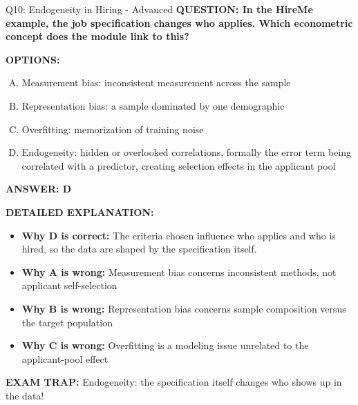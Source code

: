 \documentclass[8pt]{beamer}
\begin{document}
\begin{frame}[shrink=6]{Q10: Endogeneity in Hiring - Advanced}
\fontsize{6.5}{7.5}\selectfont
\textbf{QUESTION: In the HireMe example, the job specification changes who applies. Which econometric concept does the module link to this?}

\vspace{0.1cm}
\textbf{OPTIONS:}
\begin{enumerate}[A.]
\item Measurement bias: inconsistent measurement across the sample
\item Representation bias: a sample dominated by one demographic
\item Overfitting: memorization of training noise
\item Endogeneity: hidden or overlooked correlations, formally the error term being correlated with a predictor, creating selection effects in the applicant pool
\end{enumerate}

\vspace{0.1cm}
\textcolor{myblue}{\textbf{ANSWER: D}}

\vspace{0.1cm}
\textbf{DETAILED EXPLANATION:}
\begin{itemize}
\item \textbf{Why D is correct:} The criteria chosen influence who applies and who is hired, so the data are shaped by the specification itself.
\item \textbf{Why A is wrong:} Measurement bias concerns inconsistent methods, not applicant self-selection
\item \textbf{Why B is wrong:} Representation bias concerns sample composition versus the target population
\item \textbf{Why C is wrong:} Overfitting is a modeling issue unrelated to the applicant-pool effect
\end{itemize}

\textcolor{myred}{\textbf{EXAM TRAP:}} Endogeneity: the specification itself changes who shows up in the data!
\end{frame}
\end{document}
